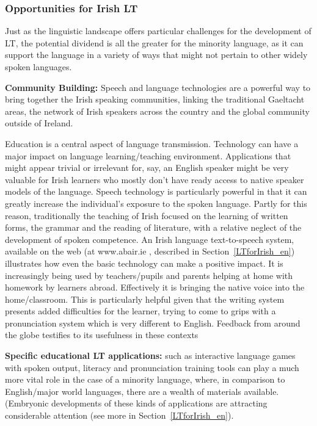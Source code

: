 \begin{multicols}{2}
\subsubsection{Opportunities for Irish LT}

Just as the linguistic landscape offers particular challenges for the development of LT, the potential dividend is all the greater for the minority language, as it can support the language in a variety of ways that might not pertain to other widely spoken languages. 

\textbf{Community Building:} Speech and language technologies are a powerful way to bring together the Irish speaking communities, linking the traditional Gaeltacht areas, the network of Irish speakers across the country and the global community outside of Ireland.

Education is a central aspect of language transmission. Technology can have a major impact on language learning/teaching environment. Applications that might appear trivial or irrelevant for, say, an English speaker might be very valuable for Irish learners who mostly don't have ready access to native speaker models of the language. Speech technology is particularly powerful in that it can greatly increase the individual's exposure to the spoken language. Partly for this reason, traditionally the teaching of Irish focused on the learning of written forms, the grammar and the reading of literature, with a relative neglect of the development of spoken competence. An Irish language text-to-speech system, available on the web (at www.abair.ie , described in Section~\ref{LTforIrish_en}) illustrates how even the basic technology can make a positive impact. It is increasingly being used by teachers/pupils and parents helping at home with homework by learners abroad. Effectively it is bringing the native voice into the home/classroom. This is particularly helpful given that the writing system presents added difficulties for the learner, trying to come to grips with a pronunciation system which is very different to English. Feedback from around the globe testifies to its usefulness in these contexts

\textbf{Specific educational LT applications:} such as interactive language games with spoken output, literacy and pronunciation training tools can play a much more vital role in the case of a minority language, where, in comparison to English/major world languages, there are a wealth of materials available. (Embryonic developments of these kinds of applications are attracting considerable attention (see more in Section~\ref{LTforIrish_en}).


\end{multicols}
